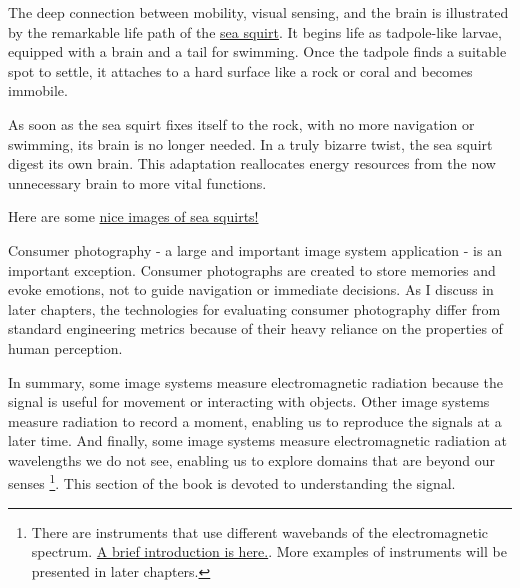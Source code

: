 \documentclass[
  letterpaper,
]{book}
\begin{document}
\begin{tcolorbox}[enhanced jigsaw, title=\textcolor{quarto-callout-note-color}{\faInfo}\hspace{0.5em}{Who needs a brain?}, colback=white, colframe=quarto-callout-note-color-frame, leftrule=.75mm, breakable, arc=.35mm, toptitle=1mm, left=2mm, colbacktitle=quarto-callout-note-color!10!white, toprule=.15mm, bottomrule=.15mm, coltitle=black, bottomtitle=1mm, titlerule=0mm, rightrule=.15mm, opacitybacktitle=0.6, opacityback=0]

The deep connection between mobility, visual sensing, and the brain is
illustrated by the remarkable life path of the
\href{https://movementum.co.uk/journal/sea-squirts}{sea squirt}. It
begins life as tadpole-like larvae, equipped with a brain and a tail for
swimming. Once the tadpole finds a suitable spot to settle, it attaches
to a hard surface like a rock or coral and becomes immobile.

As soon as the sea squirt fixes itself to the rock, with no more
navigation or swimming, its brain is no longer needed. In a truly
bizarre twist, the sea squirt digest its own brain. This adaptation
reallocates energy resources from the now unnecessary brain to more
vital functions.

Here are some
\href{https://goodheartextremescience.wordpress.com/2010/01/27/meet-the-creature-that-eats-its-own-brain/}{nice
images of sea squirts!}\\

\end{tcolorbox}

Consumer photography - a large and important image system application -
is an important exception. Consumer photographs are created to store
memories and evoke emotions, not to guide navigation or immediate
decisions. As I discuss in later chapters, the technologies for
evaluating consumer photography differ from standard engineering metrics
because of their heavy reliance on the properties of human perception.

In summary, some image systems measure electromagnetic radiation because
the signal is useful for movement or interacting with objects. Other
image systems measure radiation to record a moment, enabling us to
reproduce the signals at a later time. And finally, some image systems
measure electromagnetic radiation at wavelengths we do not see, enabling
us to explore domains that are beyond our senses \footnote{There are
  instruments that use different wavebands of the electromagnetic
  spectrum. \href{resources/lightfields-wavebands.html}{A brief
  introduction is here.}. More examples of instruments will be presented
  in later chapters.}. This section of the book is devoted to
understanding the signal.
\end{document}
